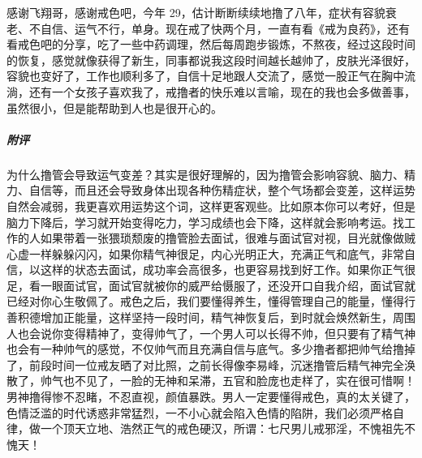 \begin{case}
    感谢飞翔哥，感谢戒色吧，今年 29，估计断断续续地撸了八年，症状有容貌衰老、不自信、运气不行，单身。现在戒了快两个月，一直有看《戒为良药》，还有看戒色吧的分享，吃了一些中药调理，然后每周跑步锻炼，不熬夜，经过这段时间的恢复，感觉就像获得了新生，同事都说我这段时间越长越帅了，皮肤光泽很好，容貌也变好了，工作也顺利多了，自信十足地跟人交流了，感觉一股正气在胸中流淌，还有一个女孩子喜欢我了，戒撸者的快乐难以言喻，现在的我也会多做善事，虽然很小，但是能帮助到人也是很开心的。
    \subparagraph{附评} 为什么撸管会导致运气变差？其实是很好理解的，因为撸管会影响容貌、脑力、精力、自信等，而且还会导致身体出现各种伤精症状，整个气场都会变差，这样运势自然会减弱，我更喜欢用运势这个词，这样更客观些。比如原本你可以考好，但是脑力下降后，学习就开始变得吃力，学习成绩也会下降，这样就会影响考运。找工作的人如果带着一张猥琐颓废的撸管脸去面试，很难与面试官对视，目光就像做贼心虚一样躲躲闪闪，如果你精气神很足，内心光明正大，充满正气和底气，非常自信，以这样的状态去面试，成功率会高很多，也更容易找到好工作。如果你正气很足，看一眼面试官，面试官就被你的威严给慑服了，还没开口自我介绍，面试官就已经对你心生敬佩了。戒色之后，我们要懂得养生，懂得管理自己的能量，懂得行善积德增加正能量，这样坚持一段时间，精气神恢复后，到时就会焕然新生，周围人也会说你变得精神了，变得帅气了，一个男人可以长得不帅，但只要有了精气神也会有一种帅气的感觉，不仅帅气而且充满自信与底气。多少撸者都把帅气给撸掉了，前段时间一位戒友晒了对比照，之前长得像李易峰，沉迷撸管后精气神完全涣散了，帅气也不见了，一脸的无神和呆滞，五官和脸庞也走样了，实在很可惜啊！男神撸得惨不忍睹，不忍直视，颜值暴跌。男人一定要懂得戒色，真的太关键了，色情泛滥的时代诱惑非常猛烈，一不小心就会陷入色情的陷阱，我们必须严格自律，做一个顶天立地、浩然正气的戒色硬汉，所谓：七尺男儿戒邪淫，不愧祖先不愧天！
\end{case}

